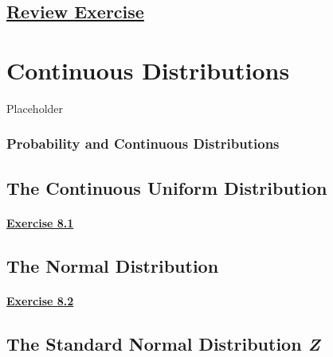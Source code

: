 \documentclass[
  11pt,
]{book}
\begin{document}
\section*{\texorpdfstring{\hyperref[re7a]{Review Exercise}}{Review Exercise}}\label{review-exercise-6}

\chapter{Continuous Distributions}\label{continuous-distributions}

Placeholder

\subsection*{Probability and Continuous Distributions}\label{probability-and-continuous-distributions}

\section{The Continuous Uniform Distribution}\label{the-continuous-uniform-distribution}

\subsubsection*{\texorpdfstring{\hyperref[ex81a]{Exercise 8.1}}{Exercise 8.1}}\label{exercise-8.1}

\section{The Normal Distribution}\label{the-normal-distribution}

\subsubsection*{\texorpdfstring{\hyperref[ex82a]{Exercise 8.2}}{Exercise 8.2}}\label{exercise-8.2}

\section{\texorpdfstring{The Standard Normal Distribution \textit{Z}}{The Standard Normal Distribution }}\label{the-standard-normal-distribution}
\end{document}
